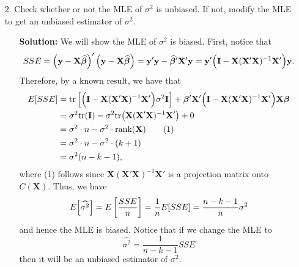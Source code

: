 \documentclass[11pt]{article}
\begin{document}
\begin{itemize}
\newpage

\item[2.] Check whether or not the MLE of $\sigma^2$ is unbiased.  If not, modify the MLE to get an unbiased estimator of $\sigma^2$.
\begin{itemize}
\item[] \textbf{Solution:}  We will show the MLE of $\sigma^2$ is biased.  First, notice that
\[
SSE = \left(\mathbf{y}-\mathbf{X}\widehat{\bm\beta}\right)'\left(\mathbf{y}-\mathbf{X}\widehat{\bm\beta}\right) = \mathbf{y'}\mathbf{y} - \widehat{\bm\beta}'\mathbf{X}'\mathbf{y} = \mathbf{y'}\Big{(}\mathbf{I} - \mathbf{X}(\mathbf{X'}\mathbf{X})^{-1}\mathbf{X}'\Big{)}\mathbf{y}.
\]
Therefore, by a known result, we have that
\begin{align*}
E[SSE] &= \text{tr}\left[\Big{(}\mathbf{I} - \mathbf{X}(\mathbf{X'}\mathbf{X})^{-1}\mathbf{X}'\Big{)}\sigma^2\mathbf{I}\right] + \bm\beta'\mathbf{X}'\Big{(}\mathbf{I} - \mathbf{X}(\mathbf{X'}\mathbf{X})^{-1}\mathbf{X}'\Big{)}\mathbf{X}\bm\beta \\
&= \sigma^2\text{tr}(\mathbf{I}) - \sigma^2\text{tr}\big{(}\mathbf{X}(\mathbf{X}'\mathbf{X})^{-1}\mathbf{X}'\big{)} + 0 \\
&= \sigma^2 \cdot n - \sigma^2 \cdot \text{rank} (\mathbf{X}) \tag{1} \\
&= \sigma^2\cdot n - \sigma^2 \cdot (k+1) \\
&= \sigma^2 (n - k - 1),
\end{align*}
where (1) follows since $\mathbf{X}(\mathbf{X}'\mathbf{X})^{-1}\mathbf{X}'$ is a projection matrix onto $C(\mathbf{X})$.  Thus, we have
\[
E\Big{[}\widehat{\sigma^2}\Big{]} = E\left[\frac{SSE}{n}\right] = \frac{1}{n}E[SSE] = \frac{n-k-1}{n}\sigma^2
\]
and hence the MLE is biased.  Notice that if we change the MLE to
\[
\widehat{\sigma^2} = \frac{1}{n-k-1}SSE
\]
then it will be an unbiased estimator of $\sigma^2$.
\end{itemize}


\end{itemize}
\end{document}

